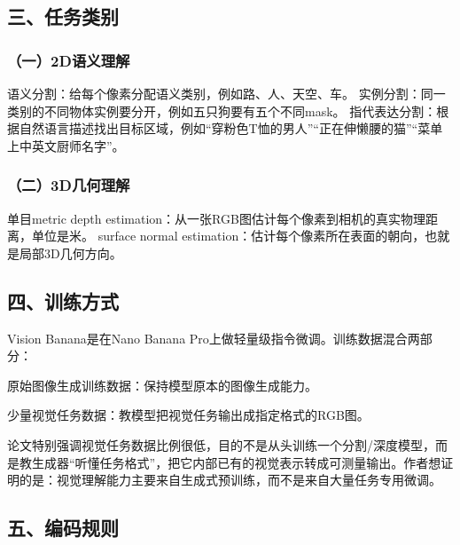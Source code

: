 \hypertarget{ux4e09ux4efbux52a1ux7c7bux522b}{%
\subsection{三、任务类别}\label{ux4e09ux4efbux52a1ux7c7bux522b}}

\hypertarget{ux4e002dux8bedux4e49ux7406ux89e3}{%
\subsubsection{（一）2D语义理解}\label{ux4e002dux8bedux4e49ux7406ux89e3}}

语义分割：给每个像素分配语义类别，例如路、人、天空、车。
实例分割：同一类别的不同物体实例要分开，例如五只狗要有五个不同mask。
指代表达分割：根据自然语言描述找出目标区域，例如``穿粉色T恤的男人''``正在伸懒腰的猫''``菜单上中英文厨师名字''。

\hypertarget{ux4e8c3dux51e0ux4f55ux7406ux89e3}{%
\subsubsection{（二）3D几何理解}\label{ux4e8c3dux51e0ux4f55ux7406ux89e3}}

单目metric depth estimation：从一张RGB图估计每个像素到相机的真实物理距离，单位是米。
surface normal estimation：估计每个像素所在表面的朝向，也就是局部3D几何方向。

\hypertarget{ux56dbux8badux7ec3ux65b9ux5f0f}{%
\subsection{四、训练方式}\label{ux56dbux8badux7ec3ux65b9ux5f0f}}

Vision Banana是在Nano Banana Pro上做轻量级指令微调。训练数据混合两部分：

原始图像生成训练数据：保持模型原本的图像生成能力。

少量视觉任务数据：教模型把视觉任务输出成指定格式的RGB图。

论文特别强调视觉任务数据比例很低，目的不是从头训练一个分割/深度模型，而是教生成器``听懂任务格式''，把它内部已有的视觉表示转成可测量输出。作者想证明的是：视觉理解能力主要来自生成式预训练，而不是来自大量任务专用微调。

\hypertarget{ux4e94ux7f16ux7801ux89c4ux5219}{%
\subsection{五、编码规则}\label{ux4e94ux7f16ux7801ux89c4ux5219}}

